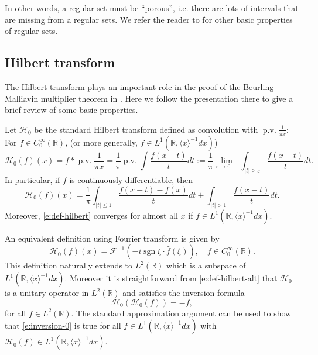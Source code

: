 \documentclass[reqno,12pt,letterpaper]{amsart}
\numberwithin{equation}{section}
\numberwithin{prop}{section}
\DeclareMathOperator{\pv}{p.v.}
\DeclareMathOperator{\sgn}{sgn}
\begin{document}
In other words, a regular set must be ``porous'', i.e. there are lots of intervals that are missing from a regular sets. We refer the reader to \cite[\S 2]{fullgap} for other basic properties of regular sets.


\subsection{Hilbert transform}
\label{s:hilbert}


The Hilbert transform plays an important role in the proof of the Beurling--Malliavin multiplier theorem in \cite{bm7}. Here we follow the presentation there to give a brief review of some basic properties.


Let $\mathcal{H}_0$ be the standard Hilbert transform defined as convolution with $\pv\frac{1}{\pi x}$: For $f\in C_0^\infty(\mathbb{R})$, (or more generally, $f\in L^1(\mathbb{R},\langle x\rangle^{-1}dx)$)
\begin{equation}
\label{e:def-hilbert}
\mathcal{H}_0(f)(x)=f\ast\pv\frac{1}{\pi x}=\frac{1}{\pi}\pv\int\frac{f(x-t)}{t}dt:=\frac{1}{\pi}\lim_{\varepsilon\to0+}\int_{|t|\geq\varepsilon}\frac{f(x-t)}{t}dt.
\end{equation}
In particular, if $f$ is continuously differentiable, then
\begin{equation}
\label{e:c1-hilbert}
\mathcal{H}_0(f)(x)=\frac{1}{\pi}\int_{|t|\leq 1}\frac{f(x-t)-f(x)}{t}dt+\int_{|t|>1}\frac{f(x-t)}{t}dt.
\end{equation}
Moreover, \eqref{e:def-hilbert} converges for almost all $x$ if $f\in L^1(\mathbb{R},\langle x\rangle^{-1}dx)$.


An equivalent definition using Fourier transform is given by
\begin{equation}
\label{e:def-hilbert-alt}
\mathcal{H}_0(f)(x)=\mathcal{F}^{-1}(-i\sgn\xi\cdot\widehat{f}(\xi)),\quad f\in C_0^\infty(\mathbb{R}).
\end{equation}
This definition naturally extends to $L^2(\mathbb{R})$ which is a subspace of $L^1(\mathbb{R},\langle x\rangle^{-1}dx)$. Moreover it is straightforward from \eqref{e:def-hilbert-alt} that $\mathcal{H}_0$ is a unitary operator in $L^2(\mathbb{R})$ and satisfies the inversion formula 
\begin{equation}
\label{e:inversion-0}
\mathcal{H}_0(\mathcal{H}_0(f))=-f,
\end{equation}
for all $f\in L^2(\mathbb{R})$. The standard approximation argument can be used to show that \eqref{e:inversion-0} is true for all $f\in L^1(\mathbb{R},\langle x\rangle^{-1}dx)$ with $\mathcal{H}_0(f)\in L^1(\mathbb{R},\langle x\rangle^{-1}dx)$.
\end{document}
